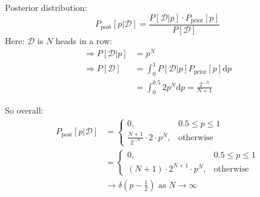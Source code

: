 \begin{solution}
    Posterior distribution:
    \[
        P_{\text{post}}[p|\mathcal{D}] = \frac{P[\mathcal{D}|p]\cdot P_{\text{prior}}[p]}{P[\mathcal{D}]}
    \]
    Here: \(\mathcal D\) is \(N\) heads in a row:
    \begin{align*}
        \Rightarrow P[\mathcal D | p] &= p^N\\
        \Rightarrow P[\mathcal D] &= \int_0^1 P[\mathcal D | p] P_{\text{prior}}[p] \mathrm{d}p\\
        &= \int_0^{0.5} 2p^N\mathrm{d}p = \frac{2^{-N}}{N+1}
    \end{align*}

    So overall:
    \begin{align*}
        P_{\text{post}}[p|\mathcal D] &= \begin{cases}
            0, & 0.5 \le p \le 1\\
            \frac{N+1}{2^{-N}}\cdot 2\cdot p^N, & \text{otherwise} 
        \end{cases}\\
        &= \begin{cases}
            0, & 0.5 \le p \le 1\\
            (N+1)\cdot 2^{N+1}\cdot p^N, & \text{otherwise} 
        \end{cases}\\
        & \to \delta (p-\tfrac{1}{2}) \text{ as } N\to\infty
    \end{align*}

\end{solution}

